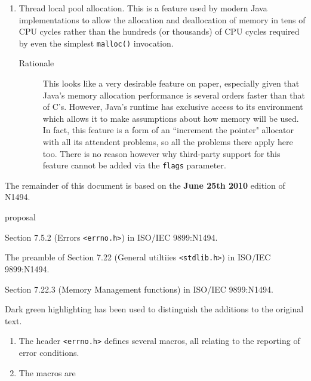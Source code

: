 \documentclass[wd]{isov2}
\begin{document}
{\begin{introduction}
\begin{enumerate}
\begin{description}
\end{description}
\item Thread local pool allocation. This is a feature used by modern Java implementations to allow the allocation and deallocation of memory in tens of CPU cycles rather than the hundreds (or thousands) of CPU cycles required by even the simplest \texttt{malloc()} invocation.
\begin{description}
\item[Rationale] This looks like a very desirable feature on paper, especially given that Java's memory allocation performance is several orders faster than that of C's. However, Java's runtime has exclusive access to its environment which allows it to make assumptions about how memory will be used. In fact, this feature is a form of an ``increment the pointer" allocator with all its attendent problems, so all the problems there apply here too. There is no reason however why third-party support for this feature cannot be added via the \texttt{flags} parameter.
\end{description}
\end{enumerate}

\end{introduction}

\normrefsclause
{}
\begin{nreferences}
\end{nreferences}
The remainder of this document is based on the \textbf{June 25th 2010} edition of N1494.

\scopeclause
\begin{inscope}{proposal}
\item Section 7.5.2 (Errors \texttt{<errno.h>}) in ISO/IEC 9899:N1494.
\item The preamble of Section 7.22 (General utiltiies \texttt{<stdlib.h>}) in ISO/IEC 9899:N1494.
\item Section 7.22.3 (Memory Management functions) in ISO/IEC 9899:N1494.
\end{inscope}

Dark green highlighting has been used to distinguish the additions to the original text.

\begin{enumerate}
\renewcommand{\theenumi}{\arabic{enumi}}
\item The header \texttt{<errno.h>} defines several macros, all relating to the reporting of error conditions.
\item The macros are


\end{enumerate}}
\end{document}

